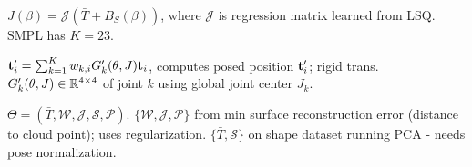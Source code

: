 \begin{definition}
    \(J(\beta) = \mathcal J(\bar T + B_S(\beta))\), where \(\mathcal J\) is regression matrix learned from LSQ. SMPL has \(K = 23\).
\end{definition}

\begin{definition}[LBS]
    \(\vb t_i' = \sum_{k=1}^K w_{k, i} G_k'(\theta, J)\vb t_i\), computes posed position \(\vb t_i'\); rigid trans. \(G_k'(\theta, J) \in \mathbb{R}^{4 \times 4}\) of joint \(k\) using global joint center \(J_k\).
\end{definition}

\begin{definition}
    \(\Theta = (\bar T, \mathcal W, \mathcal J, \mathcal S, \mathcal P)\). \(\{\mathcal W, \mathcal J, \mathcal P\}\) from min surface reconstruction error (distance to cloud point); uses regularization. \(\{\bar T, \mathcal S\}\) on shape dataset running PCA - needs pose normalization.
\end{definition}
